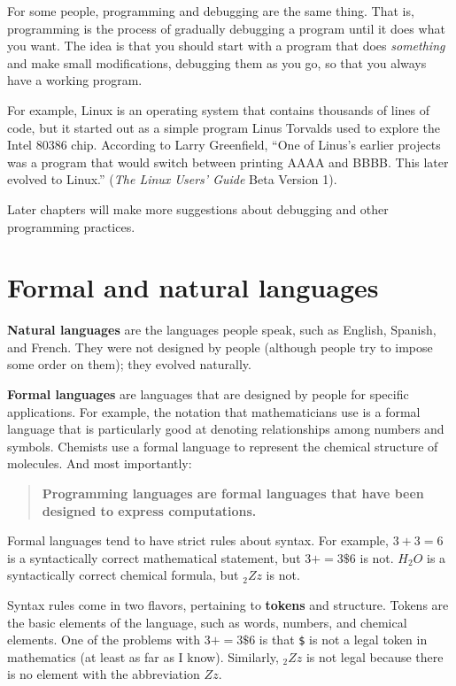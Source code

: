 \documentclass[10pt]{book}
\begin{document}

For some people, programming and debugging are the same thing.  That
is, programming is the process of gradually debugging a program until
it does what you want.  The idea is that you should start with a
program that does {\em something} and make small modifications,
debugging them as you go, so that you always have a working program.

For example, Linux is an operating system that contains thousands of
lines of code, but it started out as a simple program Linus Torvalds
used to explore the Intel 80386 chip.  According to Larry Greenfield,
``One of Linus's earlier projects was a program that would switch
between printing AAAA and BBBB.  This later evolved to Linux.''
({\em The Linux Users' Guide} Beta Version 1).


Later chapters will make more suggestions about debugging and other
programming practices.

\section{Formal and natural languages}

{\bf Natural languages} are the languages people speak,
such as English, Spanish, and French.  They were not designed
by people (although people try to impose some order on them);
they evolved naturally.

{\bf Formal languages} are languages that are designed by people for
specific applications.  For example, the notation that mathematicians
use is a formal language that is particularly good at denoting
relationships among numbers and symbols.  Chemists use a formal
language to represent the chemical structure of molecules.  And
most importantly:

\begin{quote}
{\bf Programming languages are formal languages that have been
designed to express computations.}
\end{quote}

Formal languages tend to have strict rules about syntax.  For example,
$3 + 3 = 6$ is a syntactically correct mathematical statement, but 
$3 + = 3 \mbox{\$} 6$ is not.  $H_2O$ is a syntactically correct
chemical formula, but $_2Zz$ is not.

Syntax rules come in two flavors, pertaining to {\bf tokens} and
structure.  Tokens are the basic elements of the language, such as
words, numbers, and chemical elements.  One of the problems with $3 +
= 3 \mbox{\$} 6$ is that \verb"$" is not a legal token in mathematics
(at least as far as I know).  Similarly, $_2Zz$ is not legal because
there is no element with the abbreviation $Zz$.
\end{document}
